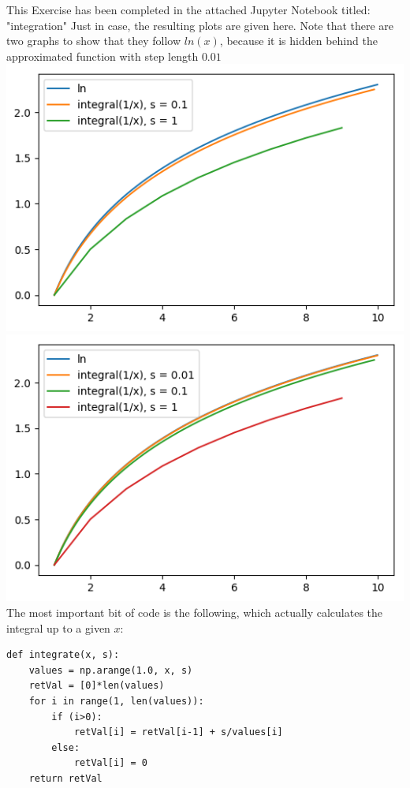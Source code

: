 This Exercise has been completed in the attached Jupyter Notebook titled: "integration"
Just in case, the resulting plots are given here. Note that there are two graphs to show that they follow $ln(x)$, because it is hidden behind the approximated function with step length $0.01$\\
\includegraphics[width=0.5\linewidth]{lnnosmall}
\includegraphics[width=0.5\linewidth]{lnwithsmall}
The most important bit of code is the following, which actually calculates the integral up to a given $x$:
\begin{verbatim}
def integrate(x, s):
    values = np.arange(1.0, x, s)
    retVal = [0]*len(values)
    for i in range(1, len(values)):
        if (i>0):
            retVal[i] = retVal[i-1] + s/values[i]
        else:
            retVal[i] = 0
    return retVal
\end{verbatim}